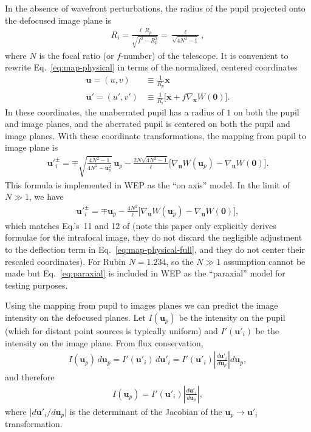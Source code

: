 \documentclass[TS,authoryear,toc]{lsstdoc}
\begin{document}
In the absence of wavefront perturbations, the radius of the pupil projected onto the defocused image plane is
\begin{align}
    R_i = \frac{\ell \, R_p}{\sqrt{f^2 - R_p^2}} = \frac{\ell}{\sqrt{4 N^2 - 1}},
\end{align}
where $N$ is the focal ratio (or $f$-number) of the telescope.
It is convenient to rewrite Eq.~\ref{eq:map-physical} in terms of the normalized, centered coordinates
\begin{align}
    \mathbf{u} = (u, v) &\equiv \frac{1}{R_p} \mathbf{x} \\
    \mathbf{u'} = (u', v') &\equiv \frac{1}{R_i} \Big[ \mathbf{x} + f \nabla_\mathbf{x} W(\mathbf{0}) \Big].
    \label{eq:normalized-coords}
\end{align}
In these coordinates, the unaberrated pupil has a radius of $1$ on both the pupil and image planes, and the aberrated pupil is centered on both the pupil and image planes.
With these coordinate transformations, the mapping from pupil to image plane is
\begin{align}
    \mathbf{u'}_{\!i}^\pm = \mp \sqrt{\frac{4 N^2 - 1}{4 N^2 - \mathbf{u}_p^2}} \, \mathbf{u}_p - \frac{2 N \sqrt{4 N^2 - 1}}{\ell} \Big[ \nabla_\mathbf{u} W(\mathbf{u}_p) - \nabla_\mathbf{u} W(\mathbf{0}) \Big].
    \label{eq:map}
\end{align}
This formula is implemented in WEP as the ``on axis'' model.
In the limit of $N \gg 1$, we have
\begin{align}
    \mathbf{u'}_{\!i}^\pm = \mp \mathbf{u}_p - \frac{4 N^2}{\ell} \Big[ \nabla_\mathbf{u} W(\mathbf{u}_p) - \nabla_\mathbf{u} W(\mathbf{0}) \Big],
    \label{eq:paraxial}
\end{align}
which matches Eq.'s~11 and 12 of \citet{1993JOSAA..10.2277R} (note this paper only explicitly derives formulae for the intrafocal image, they do not discard the negligible adjustment to the deflection term in Eq.~\ref{eq:map-physical-full}, and they do not center their rescaled coordinates).
For Rubin $N = 1.234$, so the $N \gg 1$ assumption cannot be made but Eq.~\ref{eq:paraxial} is included in WEP as the ``paraxial'' model for testing purposes.

Using the mapping from pupil to images planes we can predict the image intensity on the defocused planes.
Let $I(\mathbf{u}_p)$ be the intensity on the pupil (which for distant point sources is typically uniform) and $I'(\mathbf{u}'_i)$ be the intensity on the image plane.
From flux conservation,
\begin{align}
    I(\mathbf{u}_p) \, d \mathbf{u}_p = 
    I'(\mathbf{u}'_i) \, d \mathbf{u}'_i = 
    I'(\mathbf{u}'_i) \left\vert \frac{d \mathbf{u}'_i}{d \mathbf{u}_p} \right\vert d \mathbf{u}_p,
\end{align}
and therefore
\begin{align}
    I(\mathbf{u}_p) = I'(\mathbf{u}'_i) \left\vert \frac{d \mathbf{u}'_i}{d \mathbf{u}_p} \right\vert,
\end{align}
where $\vert d \mathbf{u}'_i / d \mathbf{u}_p \vert$ is the determinant of the Jacobian of the $\mathbf{u}_p \to \mathbf{u}'_i$ transformation.
\end{document}
